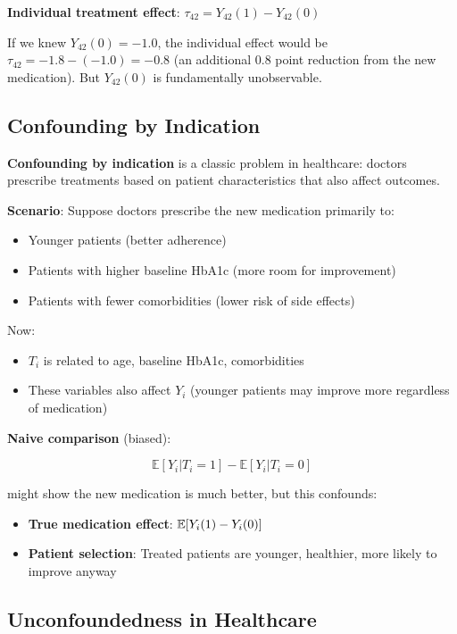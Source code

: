 \textbf{Individual treatment effect}:
\(\tau_{42} = Y_{42}(1) - Y_{42}(0)\)

If we knew \(Y_{42}(0) = -1.0\), the individual effect would be
\(\tau_{42} = -1.8 - (-1.0) = -0.8\) (an additional 0.8 point reduction
from the new medication). But \(Y_{42}(0)\) is fundamentally
unobservable.

\subsection{Confounding by Indication}\label{_confounding_by_indication}

\textbf{Confounding by indication} is a classic problem in healthcare:
doctors prescribe treatments based on patient characteristics that also
affect outcomes.

\textbf{Scenario}: Suppose doctors prescribe the new medication
primarily to:
\begin{itemize}
\item Younger patients (better adherence)
\item Patients with higher baseline HbA1c (more room for improvement)
\item Patients with fewer comorbidities (lower risk of side effects)
\end{itemize}

Now:
\begin{itemize}
\item $T_i$ is related to age, baseline HbA1c, comorbidities
\item These variables also affect $Y_i$ (younger patients may improve more regardless of medication)
\end{itemize}

\textbf{Naive comparison} (biased):

\[\mathbb{E}[Y_i | T_i = 1] - \mathbb{E}[Y_i | T_i = 0]\]

might show the new medication is much better, but this confounds:
\begin{itemize}
\item \textbf{True medication effect}: $\mathbb{E}[Y_i(1) - Y_i(0)]$
\item \textbf{Patient selection}: Treated patients are younger, healthier, more likely to improve anyway
\end{itemize}

\subsection{Unconfoundedness in
Healthcare}\label{_unconfoundedness_in_healthcare}


